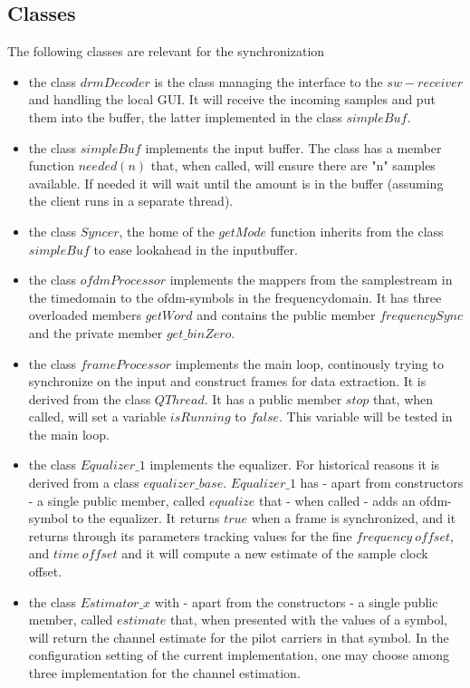 \documentclass[11pt]{article}
\begin{document}
\subsection{Classes}
The following classes are relevant for the synchronization
\begin{itemize}
\item the class $drmDecoder$ is the class managing the interface to
the $sw-receiver$ and handling the local GUI.
It will receive the incoming samples
and put them into the buffer, the latter implemented in the class $simpleBuf$.
\item the class $simpleBuf$ implements the input buffer.
The class has a member function $needed (n)$ that, when called,
will ensure there are "n" samples available. If needed it will wait
until the amount is in the buffer (assuming the client runs in
a separate thread).
\item the class $Syncer$, the home of the $getMode$ function inherits from
the class $simpleBuf$ to ease lookahead in the inputbuffer.
\item the class $ofdmProcessor$ implements the mappers from the samplestream
in the timedomain to the ofdm-symbols in the frequencydomain.
It has three overloaded members $getWord$ and contains the public
member $frequencySync$ and the private member $get\_binZero$.
\item the class $frameProcessor$  implements the main loop,  continously
trying to synchronize on the input and construct frames for data extraction.
It is derived from the class $QThread$.
It has a public member $stop$ that, when called, will set
a variable $isRunning$ to $false$. This variable
will be tested in the main loop.
\item 
the class $Equalizer\_1$ implements the equalizer. For historical reasons 
it is derived from a class $equalizer\_base$.
$Equalizer\_1$ has - apart from
constructors - a single public member, called $equalize$ that - when called -
adds an ofdm-symbol to the equalizer. It returns $true$ when
a frame is synchronized,
and it returns through its parameters tracking values for the
fine $frequency\ offset$,
and $time\ offset$ and it will compute a
new estimate of the sample clock offset.
\item the class $Estimator\_x$ with - apart from the constructors - a
single public member, called $estimate$ that, when presented with
the values of a symbol, will return the channel estimate for the pilot carriers
in that symbol.
In the configuration setting of the current implementation, one may choose
among three implementation for the channel estimation.
\end{itemize}
\end{document}
